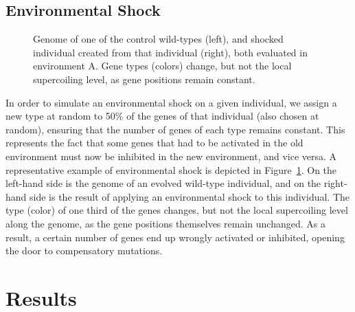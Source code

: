 \subsection{Environmental Shock}

\begin{figure}
\centering
\begin{elasticrow}[width=\textwidth]
\end{elasticrow}
\caption[Evolved wild-type individual before and after an environmental shock]{Genome of one of the control wild-types (left), and shocked individual created from that individual (right), both evaluated in environment A.
Gene types (colors) change, but not the local supercoiling level, as gene positions remain constant.}
\label{fig:epistasis:shock}
\end{figure}

In order to simulate an environmental shock on a given individual, we assign a new type at random to 50\% of the genes of that individual (also chosen at random), ensuring that the number of genes of each type remains constant.
This represents the fact that some genes that had to be activated in the old environment must now be inhibited in the new environment, and vice versa.
A representative example of environmental shock is depicted in Figure~\ref{fig:epistasis:shock}.
On the left-hand side is the genome of an evolved wild-type individual, and on the right-hand side is the result of applying an environmental shock to this individual.
The type (color) of one third of the genes changes, but not the local supercoiling level along the genome, as the gene positions themselves remain unchanged.
As a result, a certain number of genes end up wrongly activated or inhibited, opening the door to compensatory mutations.


\section{Results}

